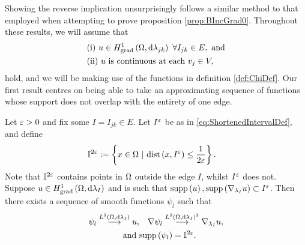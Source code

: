 Showing the reverse implication unsurprisingly follows a similar method to that employed when attempting to prove proposition \ref{prop:BIncGrad0}.
Throughout these results, we will assume that
\begin{align*}
		&\text{(i)} \ u\in H^1_\mathrm{grad}\left( \Omega, \mathrm{d}\lambda_{jk} \right) \ \forall I_{jk}\in E, \text{ and}\\
		&\text{(ii)} \ u \text{ is continuous at each } v_j\in V,
\end{align*}
hold, and we will be making use of the functions in definition \ref{def:ChiDef}.
Our first result centres on being able to take an approximating sequence of functions whose support does not overlap with the entirety of one edge.
\begin{lemma} \label{lem:SelectiveApproximatingSequences}
	Let $\varepsilon>0$ and fix some $I=I_{jk}\in E$.
	Let $I^\varepsilon$ be as in \eqref{eq:ShortenedIntervalDef}, and define
	\begin{align*}
		\mathbb{I}^{2\eps} &:= \clbracs{x\in\ddom \ \vert \ \mathrm{dist}\bracs{x, I^\eps}\leq\recip{2\eps}}.
	\end{align*}
	Note that $\mathbb{I}^{2\varepsilon}$ contains points in $\Omega$ outside the edge $I$, whilst $I^\varepsilon$ does not.
	Suppose $u\in H^1_\mathrm{grad}\left( \Omega, \mathrm{d}\lambda_I \right)$ and is such that $\mathrm{supp}\left( u \right), \mathrm{supp}\left(  \nabla_{\lambda_I} u  \right)\subset I^\varepsilon$.
	Then there exists a sequence of smooth functions $\psi_l$ such that
	\begin{align*}
		\psi_l \overset{L^{2}\left( \Omega,\mathrm{d}\lambda_I \right)}{\longrightarrow} u, 
		&\quad \nabla\psi_l \overset{L^{2}\left( \Omega,\mathrm{d}\lambda_I \right)^2}{\longrightarrow} \nabla_{\lambda_I} u, \\
		\text{and } &\mathrm{supp}\left( \psi_l \right) = \mathbb{I}^{2\varepsilon}.
	\end{align*}
\end{lemma}
